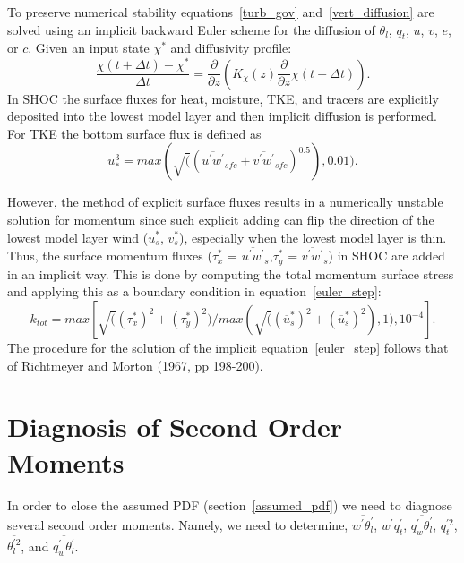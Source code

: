 \documentclass[12pt,titlepage]{article}
\numberwithin{equation}{section}
\begin{document}
To preserve numerical stability equations~\ref{turb_gov} and~\ref{vert_diffusion} are solved using an implicit backward Euler scheme for the diffusion of $\theta_{l}$, $q_{t}$, $u$, $v$, $e$, or $c$.  Given an input state $\chi^{*}$ and diffusivity profile:
%
\begin{equation}
  \frac{\chi(t+\Delta{t}) - \chi^{*}}{\Delta{t}} = \frac{\partial}{\partial{z}}\left(K_{\chi}(z)\frac{\partial}{\partial{z}}\chi(t+\Delta{t})\right) . 
  \label{euler_step}
\end{equation}
%
In SHOC the surface fluxes for heat, moisture, TKE, and tracers are explicitly deposited into the lowest model layer and then implicit diffusion is performed.  For TKE the bottom surface flux is defined as 
\begin{equation}
  u_{*}^{3} = max(\sqrt((\overline{u^{'}w^{'}}_{sfc}+\overline{v^{'}w^{'}}_{sfc})^{0.5}),0.01) . 
  \label{ustar_tke}
\end{equation}

However, the method of explicit surface fluxes results in a numerically unstable solution for momentum since such explicit adding can flip the direction of the lowest model layer wind ($\overline{u}_{s}^{*}$, $\overline{v}_{s}^{*}$), especially when the lowest model layer is thin.    Thus, the surface momentum fluxes ($\tau_{x}^{*}$ = $\overline{u^{'}w^{'}}_{s}$,$\tau_{y}^{*}$ = $\overline{v^{'}w^{'}}_{s}$) in SHOC are added in an implicit way.  This is done by computing the total momentum surface stress and applying this as a boundary condition in equation~\ref{euler_step}: 
%
\begin{equation}
  k_{tot} = max[\sqrt((\tau_{x}^{*})^{2}+(\tau_{y}^{*})^{2}) /max(\sqrt((\overline{u}_{s}^{*})^{2}+(\overline{u}_{s}^{*})^{2}),1),10^{-4}] . 
  \label{k_tot}
\end{equation}
%
The procedure for the solution of the implicit equation~\ref{euler_step} follows that of Richtmeyer and Morton (1967, pp 198-200).  

\section{Diagnosis of Second Order Moments}
\label{diag_second}

In order to close the assumed PDF (section~\ref{assumed_pdf}) we need to diagnose several second order moments.  Namely, we need to determine, $\overline{w^{'}\theta_{l}^{'}}$, $\overline{w^{'}q_{t}^{'}}$, $\overline{q_{w}^{'}\theta_{l}^{'}}$, $\overline{q_{t}^{'2}}$, $\overline{\theta_{l}^{'2}}$, and $\overline{q_{w}^{'}\theta_{l}^{'}}$. 
\end{document}
